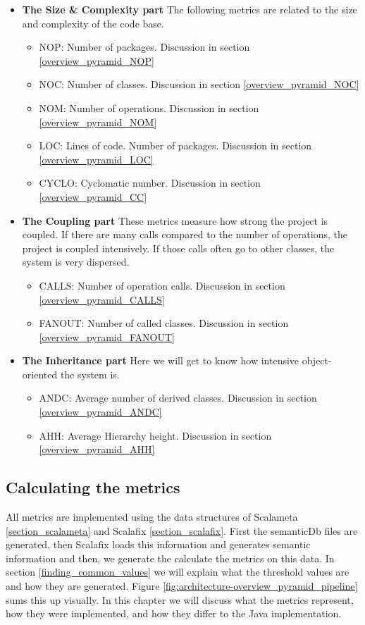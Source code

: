 \documentclass[onecolumn]{article}
\begin{document}
\begin{itemize}
\item \textbf{The Size \& Complexity part}
The following metrics are related to the size and complexity of the code base. 
\begin{itemize}
    \item NOP: Number of packages. Discussion in section \ref{overview_pyramid_NOP}
    \item NOC: Number of classes. Discussion in section \ref{overview_pyramid_NOC}
    \item NOM: Number of operations. Discussion in section \ref{overview_pyramid_NOM}
    \item LOC: Lines of code. Number of packages. Discussion in section \ref{overview_pyramid_LOC}
    \item CYCLO: Cyclomatic number. Discussion in section \ref{overview_pyramid_CC}
\end{itemize}

\item \textbf{The Coupling part}
These metrics measure how strong the project is coupled. If there are many calls compared to the number of operations, the project is coupled intensively. If those calls often go to other classes, the system is very dispersed.
\begin{itemize}
    \item CALLS: Number of operation calls. Discussion in section \ref{overview_pyramid_CALLS}
    \item FANOUT: Number of called classes. Discussion in section \ref{overview_pyramid_FANOUT}
\end{itemize}

\item \textbf{The Inheritance part}
Here we will get to know how intensive object-oriented the system is.
\begin{itemize}
    \item ANDC: Average number of derived classes. Discussion in section \ref{overview_pyramid_ANDC}
    \item AHH: Average Hierarchy height. Discussion in section \ref{overview_pyramid_AHH}
\end{itemize}
\end{itemize}


\subsection{Calculating the metrics} \label{section_CalculatingTheMetrics}
All metrics are implemented using the data structures of Scalameta \ref{section_scalameta} and Scalafix \ref{section_scalafix}. First the semanticDb files are generated, then Scalafix loads this information and generates semantic information and then, we generate the calculate the metrics on this data. In section \ref{finding_common_values} we will explain what the threshold values are and how they are generated. Figure \ref{fig:architecture-overview_pyramid_pipeline} sums this up visually. In this chapter we will discuss what the metrics represent, how they were implemented, and how they differ to the Java implementation.
\end{document}
